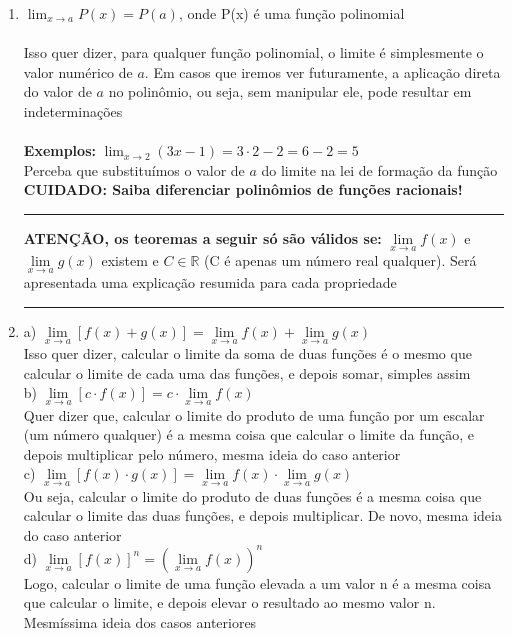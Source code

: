 \documentclass{article}
\begin{document}
\begin{enumerate}
    \item $\displaystyle \lim_{x \to a} P(x) = P(a)$, onde P(x) é uma função polinomial\\
    \\
    Isso quer dizer, para qualquer função polinomial, o limite é simplesmente o valor numérico de $a$. Em casos que iremos ver futuramente, a aplicação direta do valor de $a$ no polinômio, ou seja, sem manipular ele, pode resultar em indeterminações\\
    \\
    \textbf{Exemplos:} $\displaystyle \lim_{x \to 2} (3x - 1) = 3 \cdot 2 - 2= 6 - 2 = 5$\\
    Perceba que substituímos o valor de $a$ do limite na lei de formação da função
    \\[10pt]
    \textbf{CUIDADO: Saiba diferenciar polinômios de funções racionais!}
    \\
    \hrule
    \textbf{ATENÇÃO, os teoremas a seguir só são válidos se:} \( \lim\limits_{x \to a} f(x) \) e \( \lim\limits_{x \to a} g(x) \) existem e \( C \in \mathbb{R} \) (C é apenas um número real qualquer). Será apresentada uma explicação resumida para cada propriedade
    \\
    \hrule
    \item \begin{flushleft}
a) \quad $\lim\limits_{x \to a} [f(x) + g(x)] = \lim\limits_{x \to a} f(x) + \lim\limits_{x \to a} g(x)$ \\[10pt] Isso quer dizer, calcular o limite da soma de duas funções é o mesmo que calcular o limite de cada uma das funções, e depois somar, simples assim\\[10pt]
b) \quad $\lim\limits_{x \to a} [c \cdot f(x)] = c \cdot \lim\limits_{x \to a} f(x)$ \\[10pt]
Quer dizer que, calcular o limite do produto de uma função por um escalar (um número qualquer) é a mesma coisa que calcular o limite da função, e depois multiplicar pelo número, mesma ideia do caso anterior\\[10pt]
c) \quad $\lim\limits_{x \to a} [f(x) \cdot g(x)] = \lim\limits_{x \to a} f(x) \cdot \lim\limits_{x \to a} g(x)$ \\[10pt] Ou seja, calcular o limite do produto de duas funções é a mesma coisa que calcular o limite das duas funções, e depois multiplicar. De novo, mesma ideia do caso anterior\\[10pt]
d) \quad $\lim\limits_{x \to a} [f(x)]^n = \left( \lim\limits_{x \to a} f(x) \right)^n$ \\[10pt] Logo, calcular o limite de uma função elevada a um valor n é a mesma coisa que calcular o limite, e depois elevar o resultado ao mesmo valor n. Mesmíssima ideia dos casos anteriores\\[10pt]

\end{flushleft}
\end{enumerate}
\end{document}
